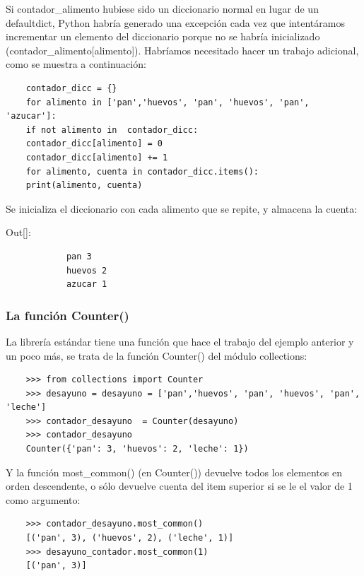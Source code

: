 Si {\ttfamily contador\_alimento} hubiese sido un diccionario normal en lugar de un
{\ttfamily defaultdict}, Python habría generado una excepción cada vez que intentáramos incrementar
un elemento del diccionario porque no se habría inicializado  ({\ttfamily contador\_alimento[alimento]}).
Habríamos necesitado hacer un trabajo adicional, como se muestra a continuación:

\hspace{-2.5cm}{\ttfamily \scriptsize contador.py}  \vspace{-0.5cm}
\begin{lstlisting}
	contador_dicc = {}
	for alimento in ['pan','huevos', 'pan', 'huevos', 'pan', 'azucar']:
	if not alimento in  contador_dicc:
	contador_dicc[alimento] = 0
	contador_dicc[alimento] += 1
	for alimento, cuenta in contador_dicc.items():
	print(alimento, cuenta)
\end{lstlisting}
Se inicializa el diccionario con cada alimento que se repite, y almacena la cuenta: 

{\ttfamily\scriptsize\noindent Out[]: \vspace{-0.3cm}	
	{\color{blue} 	
		\begin{verbatim}
			pan 3
			huevos 2
			azucar 1		
		\end{verbatim}
}}


\subsubsection{La función Counter()}

La librería estándar tiene una función que hace el trabajo del 
ejemplo anterior y un poco más, se trata de la función {\ttfamily Counter()} del módulo {\ttfamily collections}:

\begin{lstlisting}
	>>> from collections import Counter
	>>> desayuno = desayuno = ['pan','huevos', 'pan', 'huevos', 'pan', 'leche']
	>>> contador_desayuno  = Counter(desayuno)
	>>> contador_desayuno
	Counter({'pan': 3, 'huevos': 2, 'leche': 1})
\end{lstlisting}

Y la función {\ttfamily most\_common()} (en {\ttfamily Counter()}) devuelve todos los elementos en orden descendente, o sólo devuelve cuenta del item superior si se le el valor de 1 como argumento:

\begin{lstlisting}
	>>> contador_desayuno.most_common()
	[('pan', 3), ('huevos', 2), ('leche', 1)]
	>>> desayuno_contador.most_common(1)
	[('pan', 3)]
\end{lstlisting}


